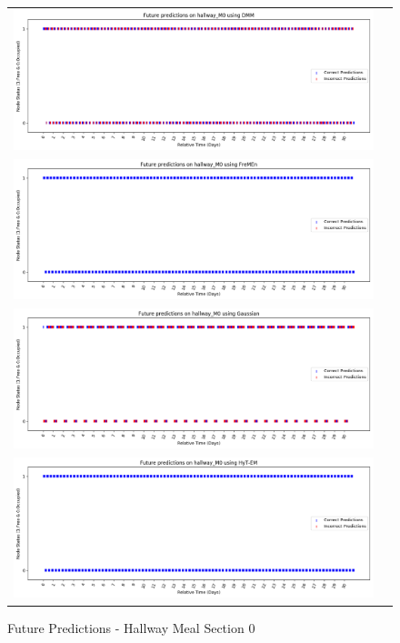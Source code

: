 \begin{center}
\begin{figure}[!Hp]
  \begin{tabular}{cc}
    {\includegraphics[width = 6in]{images/results/Future_hallway_M0_DMM.png}} \\
    {\includegraphics[width = 6in]{images/results/Future_hallway_M0_FreMEn.png}} \\
    {\includegraphics[width = 6in]{images/results/Future_hallway_M0_Gaussian.png}} \\
    {\includegraphics[width = 6in]{images/results/Future_hallway_M0_HyT-EM.png}} \\
  \end{tabular}
  \caption{Future Predictions - Hallway Meal Section 0}
\end{figure}


\end{center}
